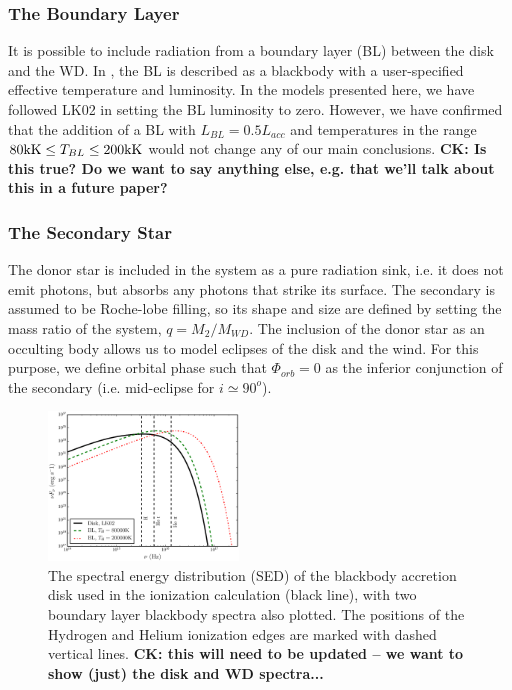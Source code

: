 \documentclass[preprint, a4paper, 11pt]{aastex}
\begin{document}
\subsubsection{The Boundary Layer}

It is possible to include radiation from a boundary layer (BL) between
the disk and the WD. In \py, the BL is described as
a blackbody with a user-specified effective temperature and
luminosity. In the models presented here, we have followed LK02 in setting
the BL luminosity to zero. However, we have confirmed that the addition of a
BL with $L_{BL} = 0.5 L_{acc}$ and temperatures in the range $80{\rm
kK} \leq T_{BL} \leq 200{\rm kK}$ would not change any of our main
conclusions. 
{\bf CK: Is this true? Do we want to say anything else, e.g. that we'll
     talk about this in a future paper?}  

\subsubsection{The Secondary Star}

The donor star is included in the system as a pure radiation sink, 
i.e. it does not emit photons, but absorbs any photons that strike its
surface. The secondary is assumed to be Roche-lobe filling, so its
shape and size are defined by setting the mass ratio of the system, $q
= M_2/M_{WD}$. The inclusion of the donor star as an occulting body
allows us to model eclipses of the disk and the wind. For this
purpose, we define orbital phase such that $\Phi_{orb} = 0$ as the
inferior conjunction of the secondary (i.e. mid-eclipse for $i \simeq
90^o$).

\begin{figure}
\centering
\includegraphics[width=0.45\textwidth]{figures/sed_figure.eps}
\caption{
The spectral energy distribution (SED) of the blackbody accretion
disk used in the ionization calculation (black line), 
with two boundary layer blackbody spectra also plotted.
The positions of the Hydrogen and Helium ionization edges 
are marked with dashed vertical lines.
{\bf CK: this will need to be updated -- we want to show (just) the disk and
  WD spectra...}
}
\label{sed}
\end{figure}
\end{document}
